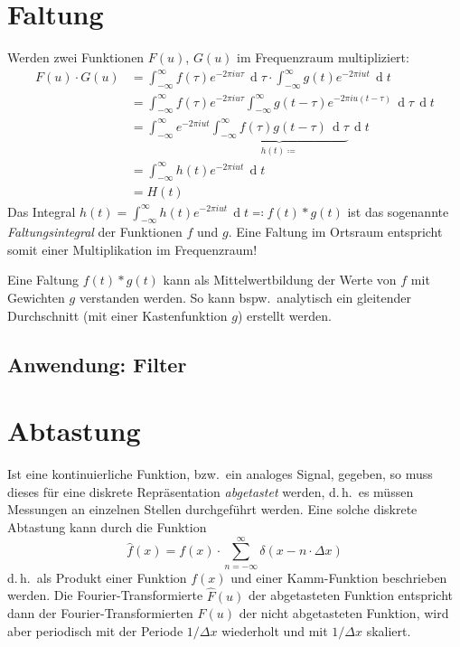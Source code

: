 \documentclass[a4paper, 11pt, accentcolor = tud3b]{tudreport}
\DeclareMathOperator{\total}{d}
\newcommand{\dif}[1]{\,\total#1}
\renewcommand{\dh}{d.\,h.~}
\newcommand{\bzw}{bzw.~}
\newcommand{\bspw}{bspw.~}
\begin{document}
		\section{Faltung}
			Werden zwei Funktionen \( F(u) \), \( G(u) \) im Frequenzraum multipliziert:
			\begin{align*}
				F(u) \cdot G(u)
					&= \int_{-\infty}^{\infty} \! f(\tau) e^{-2\pi i u \tau} \dif{\tau} \cdot \int_{-\infty}^{\infty} \! g(t) e^{-2\pi i u t} \dif{t} \\
					&= \int_{-\infty}^{\infty} \! f(\tau) e^{-2\pi i u \tau} \int_{-\infty}^{\infty} \! g(t - \tau) e^{-2\pi i u (t - \tau)} \dif{\tau} \dif{t} \\
					&= \int_{-\infty}^{\infty} \! e^{-2\pi i u t} \underbrace{\int_{-\infty}^{\infty} \! f(\tau) g(t - \tau) \dif{\tau}}_{h(t) \coloneqq} \dif{t} \\
					&= \int_{-\infty}^{\infty} \! h(t) e^{-2\pi i u t} \dif{t} \\
					&= H(t)
			\end{align*}
			Das Integral \( h(t) = \int_{-\infty}^{\infty} \! h(t) e^{-2\pi i u t} \dif{t} \eqqcolon f(t) \ast g(t) \) ist das sogenannte \emph{Faltungsintegral} der Funktionen \(f\) und \(g\). Eine Faltung im Ortsraum entspricht somit einer Multiplikation im Frequenzraum!
			
			Eine Faltung \( f(t) \ast g(t) \) kann als Mittelwertbildung der Werte von \(f\) mit Gewichten \(g\) verstanden werden. So kann \bspw analytisch ein gleitender Durchschnitt (mit einer Kastenfunktion \(g\)) erstellt werden.
			
			\subsection{Anwendung: Filter} %

		\section{Abtastung}
			Ist eine kontinuierliche Funktion, \bzw ein analoges Signal, gegeben, so muss dieses für eine diskrete Repräsentation \emph{abgetastet} werden, \dh es müssen Messungen an einzelnen Stellen durchgeführt werden. Eine solche diskrete Abtastung kann durch die Funktion
			\begin{equation*}
				\hat{f}(x) = f(x) \cdot \sum_{n = -\infty}^{\infty} \delta(x - n \cdot \Delta x)
			\end{equation*}
			\dh als Produkt einer Funktion \( f(x) \) und einer Kamm-Funktion beschrieben werden. Die Fourier-Transformierte \( \hat{F}(u) \) der abgetasteten Funktion entspricht dann der Fourier-Transformierten \( F(u) \) der nicht abgetasteten Funktion, wird aber periodisch mit der Periode \( 1/\Delta x \) wiederholt und mit \( 1/\Delta x \) skaliert.
\end{document}
